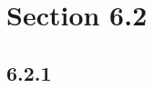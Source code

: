 \documentclass{article}
\begin{document}
\newcommand{\hr}{\par\noindent\rule{\textwidth}{0.4pt}}

\newcommand{\bc}[1]{
	\begin{equation*}
		\begin{boxed}
			{#1}
		\end{boxed}
	\end{equation*}
}

\newcommand{\cond}[2]{
	\ifmmode
		{#1} \quad {#2}
	\else
		$$ {#1} \quad {#2} $$
	\fi
}

\newcommand{\matr}[1]{\bm{#1}}
\newcommand{\vect}[1]{
	\ifmmode \mathbf{#1}
	\else \textbf{#1}
	\fi
}

\tableofcontents

\section{Section 6.2}

\subsection{6.2.1}
\end{document}
